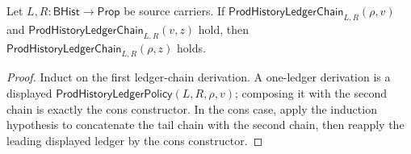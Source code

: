 \begin{theorem}
\label{thm:prod-ledger-chain-transitivity}
Let $L,R:\mathsf{BHist}\to\mathsf{Prop}$ be source carriers. If
$\mathsf{ProdHistoryLedgerChain}_{L,R}(\rho,v)$ and
$\mathsf{ProdHistoryLedgerChain}_{L,R}(v,z)$ hold, then
$\mathsf{ProdHistoryLedgerChain}_{L,R}(\rho,z)$ holds.
\end{theorem}
\begin{proof}
Induct on the first ledger-chain derivation. A one-ledger derivation is a
displayed $\mathsf{ProdHistoryLedgerPolicy}(L,R,\rho,v)$; composing it with the
second chain is exactly the cons constructor. In the cons case, apply the
induction hypothesis to concatenate the tail chain with the second chain, then
reapply the leading displayed ledger by the cons constructor.
\end{proof}


